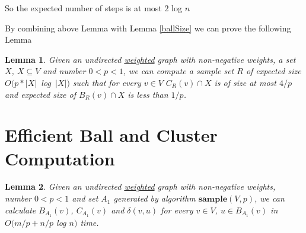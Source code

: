 \documentclass[shortabstract, lic, english]{iithesis}
\theoremstyle{definition} \newtheorem{definition}{Definition}[chapter]
\theoremstyle{remark} \newtheorem{remark}[definition]{Observation}
\theoremstyle{plain} \newtheorem{theorem}[definition]{Theorem}
\theoremstyle{plain} \newtheorem{lemma}[definition]{Lemma}
\theoremstyle{plain} \newtheorem{conjecture}[definition]{Conjecture}
\begin{document}
So the expected number of steps is at most $2$ log $n$

By combining above Lemma with Lemma \ref{ballSize} we can prove the following Lemma

\begin{lemma} \label{sampleAlg}
    Given an undirected \underline{weighted} graph with non-negative weights, a set $X$, $X \subseteq V$ and number $0 < p < 1$, we can compute a sample set
    $R$ of expected size $O(p*|X|$~log~$|X|)$ such that for every $v \in V$ $C_R(v) \cap X$ is of size at most $4/p$ and expected size of $B_R(v) \cap X$ is less than $1/p$.
\end{lemma}


\section{Efficient Ball and Cluster Computation}

\begin{lemma} \label{ballClusterComputation}
    Given an undirected \underline{weighted} graph with non-negative weights, number $0 < p < 1$ and set $A_1$ generated by algorithm $\mathbf{sample}(V, p)$,
    we can calculate $B_{A_1}(v)$, $C_{A_1}(v)$ and $\delta(v,u)$ for every $v \in V$, $u \in B_{A_1}(v)$ in $O(m/p + n/p $ log $n )$ time.
\end{lemma}
\end{document}
